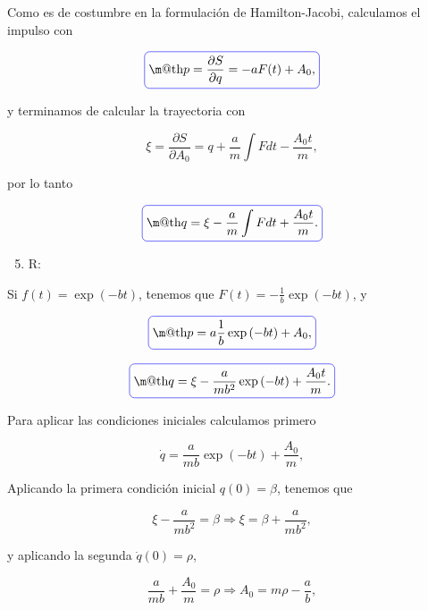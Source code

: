 \documentclass[a4paper,10pt]{article}
\makeatletter
\numberwithin{equation}{section}
\newcommand*{\boxcolor}{blue}
\renewcommand{\boxed}[1]{\textcolor{\boxcolor}{%
\tikz[baseline={([yshift=-1ex]current bounding box.center)}] \node [rectangle, minimum width=1ex,rounded corners,draw] {\normalcolor\m@th$\displaystyle#1$};}}
\makeatother
\begin{document}
Como es de costumbre en la formulación de Hamilton-Jacobi, calculamos el impulso 
con 

\begin{equation}
 \boxed{p = \frac{\partial S}{\partial q} = -aF(t) + A_0,}
\end{equation}

y terminamos de calcular la trayectoria con 

\begin{equation}
 \xi = \frac{\partial S}{\partial A_0} = q + \frac{a}{m}\int F dt - \frac{A_0t}{m},
\end{equation}

por lo tanto 

\begin{equation}
 \boxed{q = \xi - \frac{a}{m}\int F dt + \frac{A_0t}{m}.}
\end{equation}

\begin{enumerate}[label=\alph*)]
\setcounter{enumi}{4}
 \item R:
\end{enumerate}

Si $f(t) = \exp{(-bt)}$, tenemos que $F(t) = - \frac{1}{b}\exp{(-bt)}$, y 

\begin{equation}
 \boxed{p = a\frac{1}{b}\exp{(-bt)} + A_0,}
\end{equation}

\begin{equation}
 \boxed{q = \xi - \frac{a}{mb^2}\exp{(-bt)} + \frac{A_0t}{m}.}
\end{equation}

Para aplicar las condiciones iniciales calculamos primero

\begin{equation}
 \dot{q} = \frac{a}{mb}\exp{(-bt)} + \frac{A_0}{m},
\end{equation}

Aplicando la primera condición inicial $q(0) = \beta$, tenemos que 

\begin{equation}
 \xi - \frac{a}{mb^2} = \beta \Rightarrow \xi = \beta + \frac{a}{mb^2},
\end{equation}

y aplicando la segunda $\dot{q}(0) = \rho$, 

\begin{equation}
\frac{a}{mb} + \frac{A_0}{m} = \rho \Rightarrow A_0 = m\rho - \frac{a}{b}, 
\end{equation}
\end{document}
